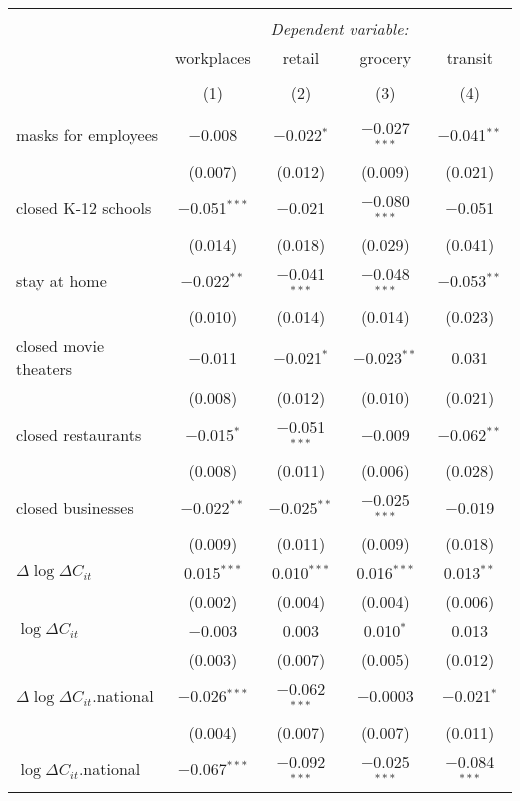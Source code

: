 \begin{tabular}{@{\extracolsep{1pt}}lcccc} 
\\[-1.8ex]\hline 
\hline \\[-1.8ex] 
 & \multicolumn{4}{c}{\textit{Dependent variable:}} \\ 
\cline{2-5} 
 & workplaces & retail & grocery & transit \\ 
\\[-1.8ex] & (1) & (2) & (3) & (4)\\ 
\hline \\[-1.8ex] 
 masks for employees & $-$0.008 & $-$0.022$^{*}$ & $-$0.027$^{***}$ & $-$0.041$^{**}$ \\ 
  & (0.007) & (0.012) & (0.009) & (0.021) \\ 
  closed K-12 schools & $-$0.051$^{***}$ & $-$0.021 & $-$0.080$^{***}$ & $-$0.051 \\ 
  & (0.014) & (0.018) & (0.029) & (0.041) \\ 
  stay at home & $-$0.022$^{**}$ & $-$0.041$^{***}$ & $-$0.048$^{***}$ & $-$0.053$^{**}$ \\ 
  & (0.010) & (0.014) & (0.014) & (0.023) \\ 
  closed movie theaters & $-$0.011 & $-$0.021$^{*}$ & $-$0.023$^{**}$ & 0.031 \\ 
  & (0.008) & (0.012) & (0.010) & (0.021) \\ 
  closed restaurants & $-$0.015$^{*}$ & $-$0.051$^{***}$ & $-$0.009 & $-$0.062$^{**}$ \\ 
  & (0.008) & (0.011) & (0.006) & (0.028) \\ 
  closed businesses & $-$0.022$^{**}$ & $-$0.025$^{**}$ & $-$0.025$^{***}$ & $-$0.019 \\ 
  & (0.009) & (0.011) & (0.009) & (0.018) \\ 
  $\Delta \log \Delta C_{it}$ & 0.015$^{***}$ & 0.010$^{***}$ & 0.016$^{***}$ & 0.013$^{**}$ \\ 
  & (0.002) & (0.004) & (0.004) & (0.006) \\ 
  $\log \Delta C_{it}$ & $-$0.003 & 0.003 & 0.010$^{*}$ & 0.013 \\ 
  & (0.003) & (0.007) & (0.005) & (0.012) \\ 
  $\Delta \log \Delta C_{it}$.national & $-$0.026$^{***}$ & $-$0.062$^{***}$ & $-$0.0003 & $-$0.021$^{*}$ \\ 
  & (0.004) & (0.007) & (0.007) & (0.011) \\ 
  $\log \Delta C_{it}$.national & $-$0.067$^{***}$ & $-$0.092$^{***}$ & $-$0.025$^{***}$ & $-$0.084$^{***}$ \\ 

\end{tabular}
